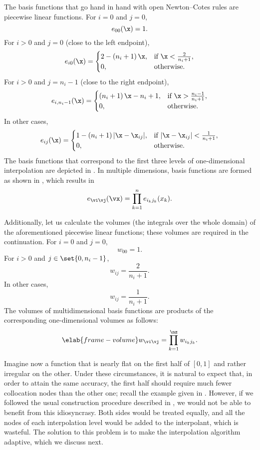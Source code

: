 The basis functions that go hand in hand with open Newton--Cotes rules are
piecewise linear functions. For $i = 0$ and $j = 0$,
\[
  e_{00}(\x) = 1.
\]
For $i > 0$ and $j = 0$ (close to the left endpoint),
\[
  e_{i0}(\x) =
  \begin{cases}
    2 - \left(n_i + 1\right) \x, & \text{if } \x < \frac{2}{n_i + 1}, \\
    0, & \text{otherwise}.
  \end{cases}
\]
For $i > 0$ and $j = n_i - 1$ (close to the right endpoint),
\[
  e_{i, n_i - 1}(\x) =
  \begin{cases}
    \left(n_i + 1\right) \x - n_i + 1, & \text{if } \x > \frac{n_i - 1}{n_i + 1}, \\
    0, & \text{otherwise}.
  \end{cases}
\]
In other cases,
\[
  e_{ij}(\x) =
  \begin{cases}
    1 - \left(n_i + 1\right)|\x - \x_{ij}|, & \text{if } |\x - \x_{ij}| < \frac{1}{n_i + 1}, \\
    0, & \text{otherwise}.
  \end{cases}
\]
The basis functions that correspond to the first three levels of one-dimensional
interpolation are depicted in . In multiple dimensions, basis
functions are formed as shown in , which results in
\[
  e_{\vi \vj}(\vx) = \prod_{k = 1}^n e_{i_k j_k}(x_k).
\]

Additionally, let us calculate the volumes (the integrals over the whole domain)
of the aforementioned piecewise linear functions; these volumes are required in
the continuation. For $i = 0$ and $j = 0$,
\[
  w_{00} = 1.
\]
For $i > 0$ and $j \in \set{0, n_i - 1}$,
\[
  w_{ij} = \frac{2}{n_i + 1}.
\]
In other cases,
\[
  w_{ij} = \frac{1}{n_i + 1}.
\]
The volumes of multidimensional basis functions are products of the
corresponding one-dimensional volumes as follows:
\begin{equation} \elab{frame-volume}
  w_{\vi \vj} = \prod_{k = 1}^\nz w_{i_k j_k}.
\end{equation}

Imagine now a function that is nearly flat on the first half of $[0, 1]$ and
rather irregular on the other. Under these circumstances, it is natural to
expect that, in order to attain the same accuracy, the first half should require
much fewer collocation nodes than the other one; recall the example given in
. However, if we followed the usual construction
procedure described in , we would not be able to
benefit from this idiosyncrasy. Both sides would be treated equally, and all the
nodes of each interpolation level would be added to the interpolant, which is
wasteful. The solution to this problem is to make the interpolation algorithm
adaptive, which we discuss next.

